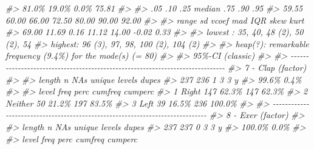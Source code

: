\documentclass[
]{book}
\newenvironment{Shaded}{\begin{snugshade}}{\end{snugshade}}
\newcommand{\CommentTok}[1]{\textcolor[rgb]{0.56,0.35,0.01}{\textit{#1}}}
\begin{document}
\begin{Shaded}
\begin{Highlighting}[]
\CommentTok{\#\textgreater{}           81.0\%  19.0\%           0.0\%          75.81}
\CommentTok{\#\textgreater{}                                                     }
\CommentTok{\#\textgreater{}      .05    .10    .25  median    .75    .90     .95}
\CommentTok{\#\textgreater{}    59.55  60.00  66.00   72.50  80.00  90.00   92.00}
\CommentTok{\#\textgreater{}                                                     }
\CommentTok{\#\textgreater{}    range     sd  vcoef     mad    IQR   skew    kurt}
\CommentTok{\#\textgreater{}    69.00  11.69   0.16   11.12  14.00  {-}0.02    0.33}
\CommentTok{\#\textgreater{}                                                     }
\CommentTok{\#\textgreater{} lowest : 35, 40, 48 (2), 50 (2), 54}
\CommentTok{\#\textgreater{} highest: 96 (3), 97, 98, 100 (2), 104 (2)}
\CommentTok{\#\textgreater{} }
\CommentTok{\#\textgreater{} heap(?): remarkable frequency (9.4\%) for the mode(s) (= 80)}
\CommentTok{\#\textgreater{} }
\CommentTok{\#\textgreater{} \textquotesingle{} 95\%{-}CI (classic)}
\CommentTok{\#\textgreater{} }
\CommentTok{\#\textgreater{} {-}{-}{-}{-}{-}{-}{-}{-}{-}{-}{-}{-}{-}{-}{-}{-}{-}{-}{-}{-}{-}{-}{-}{-}{-}{-}{-}{-}{-}{-}{-}{-}{-}{-}{-}{-}{-}{-}{-}{-}{-}{-}{-}{-}{-}{-}{-}{-}{-}{-}{-}{-}{-}{-}{-}{-}{-}{-}{-}{-}{-}{-}{-}{-}{-}{-}{-}{-}{-}{-}{-}{-}{-}{-}{-}{-}{-}{-} }
\CommentTok{\#\textgreater{} 7 {-} Clap (factor)}
\CommentTok{\#\textgreater{} }
\CommentTok{\#\textgreater{}   length      n    NAs unique levels  dupes}
\CommentTok{\#\textgreater{}      237    236      1      3      3      y}
\CommentTok{\#\textgreater{}           99.6\%   0.4\%                     }
\CommentTok{\#\textgreater{} }
\CommentTok{\#\textgreater{}      level  freq   perc  cumfreq  cumperc}
\CommentTok{\#\textgreater{} 1    Right   147  62.3\%      147    62.3\%}
\CommentTok{\#\textgreater{} 2  Neither    50  21.2\%      197    83.5\%}
\CommentTok{\#\textgreater{} 3     Left    39  16.5\%      236   100.0\%}
\CommentTok{\#\textgreater{} }
\CommentTok{\#\textgreater{} {-}{-}{-}{-}{-}{-}{-}{-}{-}{-}{-}{-}{-}{-}{-}{-}{-}{-}{-}{-}{-}{-}{-}{-}{-}{-}{-}{-}{-}{-}{-}{-}{-}{-}{-}{-}{-}{-}{-}{-}{-}{-}{-}{-}{-}{-}{-}{-}{-}{-}{-}{-}{-}{-}{-}{-}{-}{-}{-}{-}{-}{-}{-}{-}{-}{-}{-}{-}{-}{-}{-}{-}{-}{-}{-}{-}{-}{-} }
\CommentTok{\#\textgreater{} 8 {-} Exer (factor)}
\CommentTok{\#\textgreater{} }
\CommentTok{\#\textgreater{}   length      n    NAs unique levels  dupes}
\CommentTok{\#\textgreater{}      237    237      0      3      3      y}
\CommentTok{\#\textgreater{}          100.0\%   0.0\%                     }
\CommentTok{\#\textgreater{} }
\CommentTok{\#\textgreater{}    level  freq   perc  cumfreq  cumperc}

\end{Highlighting}
\end{Shaded}
\end{document}

